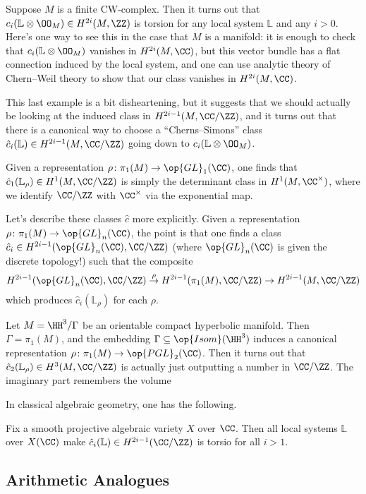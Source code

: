 \documentclass{article}
\begin{document}
\begin{example}
	Suppose $M$ is a finite CW-complex. Then it turns out that $c_i(\mathbb L\otimes\OO_M)\in H^{2i}(M,\ZZ)$ is torsion for any local system $\mathbb L$ and any $i>0$. Here's one way to see this in the case that $M$ is a manifold: it is enough to check that $c_i(\mathbb L\otimes\OO_M)$ vanishes in $H^{2i}(M,\CC)$, but this vector bundle has a flat connection induced by the local system, and one can use analytic theory of Chern--Weil theory to show that our class vanishes in $H^{2i}(M,\CC)$.
\end{example}
This last example is a bit disheartening, but it suggests that we should actually be looking at the induced class in $H^{2i-1}(M,\CC/\ZZ)$, and it turns out that there is a canonical way to choose a ``Cherns--Simons'' class $\hat c_i(\mathbb L)\in H^{2i-1}(M,\CC/\ZZ)$ going down to $c_i(\mathbb L\otimes\OO_M)$.
\begin{example}
	Given a representation $\rho\colon\pi_1(M)\to\op{GL}_1(\CC)$, one finds that $\hat c_1(\mathbb L_\rho)\in H^1(M,\CC/\ZZ)$ is simply the determinant class in $H^1(M,\CC^\times)$, where we identify $\CC/\ZZ$ with $\CC^\times$ via the exponential map.
\end{example}
Let's describe these classes $\hat c$ more explicitly. Given a representation $\rho\colon\pi_1(M)\to\op{GL}_n(\CC)$, the point is that one finds a class $\hat c_i\in H^{2i-1}(\op{GL}_n(\CC),\CC/\ZZ)$ (where $\op{GL}_n(\CC)$ is given the discrete topology!) such that the composite
\[H^{2i-1}(\op{GL}_n(\CC),\CC/\ZZ)\stackrel\rho\to H^{2i-1}(\pi_1(M),\CC/\ZZ)\to H^{2i-1}(M,\CC/\ZZ)\]
which produces $\hat c_i(\mathbb L_\rho)$ for each $\rho$.
\begin{example}
	Let $M=\HH^3/\Gamma$ be an orientable compact hyperbolic manifold. Then $\Gamma=\pi_1(M)$, and the embedding $\Gamma\subseteq\op{Isom}(\HH^3)$ induces a canonical representation $\rho\colon\pi_1(M)\to\op{PGL}_2(\CC)$. Then it turns out that $\hat c_2(\mathbb L_\rho)\in H^3(M,\CC/\ZZ)$ is actually just outputting a number in $\CC/\ZZ$. The imaginary part remembers the volume
\end{example}
In classical algebraic geometry, one has the following.
\begin{theorem}[Reznikov]
	Fix a smooth projective algebraic variety $X$ over $\CC$. Then all local systems $\mathbb L$ over $X(\CC)$ make $\hat c_i(\mathbb L)\in H^{2i-1}(\CC/\ZZ)$ is torsio for all $i>1$.
\end{theorem}

\subsection{Arithmetic Analogues}
\end{document}
